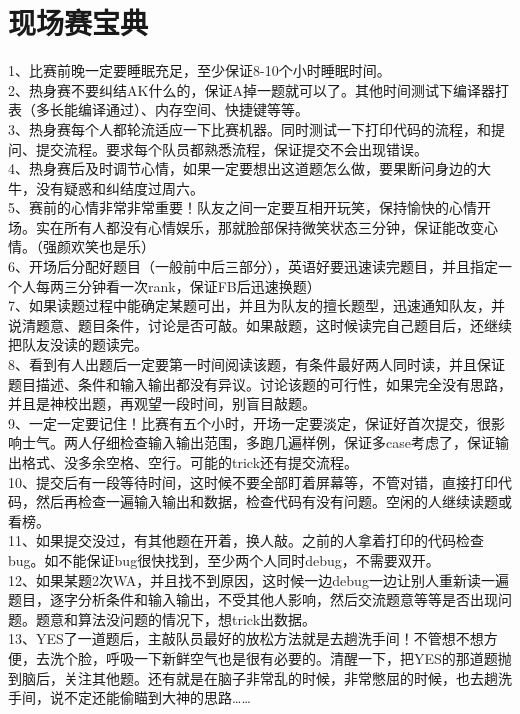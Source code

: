 \section{现场赛宝典}
1、比赛前晚一定要睡眠充足，至少保证8-10个小时睡眠时间。 \\
2、热身赛不要纠结AK什么的，保证A掉一题就可以了。其他时间测试下编译器打表（多长能编译通过）、内存空间、快捷键等等。 \\
3、热身赛每个人都轮流适应一下比赛机器。同时测试一下打印代码的流程，和提问、提交流程。要求每个队员都熟悉流程，保证提交不会出现错误。 \\
4、热身赛后及时调节心情，如果一定要想出这道题怎么做，要果断问身边的大牛，没有疑惑和纠结度过周六。 \\
5、赛前的心情非常非常重要！队友之间一定要互相开玩笑，保持愉快的心情开场。实在所有人都没有心情娱乐，那就脸部保持微笑状态三分钟，保证能改变心情。（强颜欢笑也是乐） \\
6、开场后分配好题目（一般前中后三部分），英语好要迅速读完题目，并且指定一个人每两三分钟看一次rank，保证FB后迅速换题） \\
7、如果读题过程中能确定某题可出，并且为队友的擅长题型，迅速通知队友，并说清题意、题目条件，讨论是否可敲。如果敲题，这时候读完自己题目后，还继续把队友没读的题读完。 \\
8、看到有人出题后一定要第一时间阅读该题，有条件最好两人同时读，并且保证题目描述、条件和输入输出都没有异议。讨论该题的可行性，如果完全没有思路，并且是神校出题，再观望一段时间，别盲目敲题。 \\
9、一定一定要记住！比赛有五个小时，开场一定要淡定，保证好首次提交，很影响士气。两人仔细检查输入输出范围，多跑几遍样例，保证多case考虑了，保证输出格式、没多余空格、空行。可能的trick还有提交流程。 \\
10、提交后有一段等待时间，这时候不要全部盯着屏幕等，不管对错，直接打印代码，然后再检查一遍输入输出和数据，检查代码有没有问题。空闲的人继续读题或看榜。 \\
11、如果提交没过，有其他题在开着，换人敲。之前的人拿着打印的代码检查bug。如不能保证bug很快找到，至少两个人同时debug，不需要双开。 \\
12、如果某题2次WA，并且找不到原因，这时候一边debug一边让别人重新读一遍题目，逐字分析条件和输入输出，不受其他人影响，然后交流题意等等是否出现问题。题意和算法没问题的情况下，想trick出数据。 \\
13、YES了一道题后，主敲队员最好的放松方法就是去趟洗手间！不管想不想方便，去洗个脸，呼吸一下新鲜空气也是很有必要的。清醒一下，把YES的那道题抛到脑后，关注其他题。还有就是在脑子非常乱的时候，非常憋屈的时候，也去趟洗手间，说不定还能偷瞄到大神的思路…… \\
